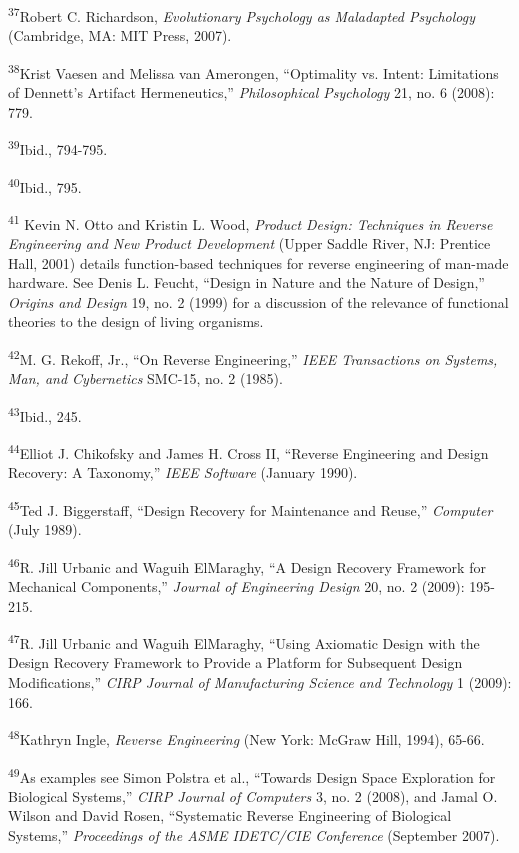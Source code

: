 \textsuperscript{37}Robert C. Richardson, \textit{Evolutionary
Psychology as Maladapted Psychology} (Cambridge, MA: MIT Press, 2007).


\textsuperscript{38}Krist Vaesen and Melissa van Amerongen, “Optimality
vs. Intent: Limitations of Dennett’s Artifact Hermeneutics,”
\textit{Philosophical Psychology} 21, no. 6 (2008): 779.


\textsuperscript{39}Ibid., 794-795.


\textsuperscript{40}Ibid., 795.


\textsuperscript{41} Kevin N. Otto and Kristin L. Wood, \textit{Product
Design: Techniques in Reverse Engineering and New Product Development}
(Upper Saddle River, NJ: Prentice Hall, 2001) details function-based
techniques for reverse engineering of man-made hardware. See Denis L.
Feucht, “Design in Nature and the Nature of Design,” \textit{Origins
and Design} 19, no. 2 (1999) for a discussion of the relevance of
functional theories to the design of living organisms.


\textsuperscript{42}M. G. Rekoff, Jr., “On Reverse Engineering,”
\textit{IEEE Transactions on Systems, Man, and Cybernetics} SMC-15, no.
2 (1985).


\textsuperscript{43}Ibid., 245.


\textsuperscript{44}Elliot J. Chikofsky and James H. Cross II, “Reverse
Engineering and Design Recovery: A Taxonomy,” \textit{IEEE Software}
(January 1990).


\textsuperscript{45}Ted J. Biggerstaff, “Design Recovery for Maintenance
and Reuse,” \textit{Computer} (July 1989).


\textsuperscript{46}R. Jill Urbanic and Waguih ElMaraghy, “A Design
Recovery Framework for Mechanical Components,” \textit{Journal of
Engineering Design} 20, no. 2 (2009): 195-215.


\textsuperscript{47}R. Jill Urbanic and Waguih ElMaraghy, “Using
Axiomatic Design with the Design Recovery Framework to Provide a
Platform for Subsequent Design Modifications,” \textit{CIRP Journal of
Manufacturing Science and Technology} 1 (2009): 166.


\textsuperscript{48}Kathryn Ingle, \textit{Reverse Engineering }(New
York: McGraw Hill, 1994), 65-66.


\textsuperscript{49}As examples see Simon Polstra et al., “Towards
Design Space Exploration for Biological Systems,” \textit{CIRP Journal
of Computers} 3, no. 2 (2008), and Jamal O. Wilson and David Rosen,
“Systematic Reverse Engineering of Biological Systems,”
\textit{Proceedings of the ASME IDETC/CIE Conference }(September
2007).



